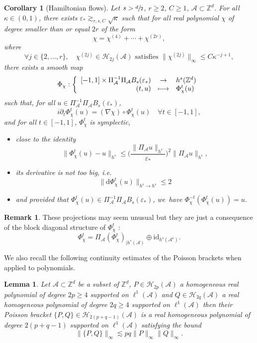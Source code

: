 \documentclass[10pt]{amsart}
\newcommand{\ie}{i.e.}
\let\dpl\displaystyle
\newcommand\mto{\mathchoice{\longmapsto}{\mapsto}{\mapsto}{\mapsto}}
\theoremstyle{plain}
\newtheorem{corollary}[theorem]{Corollary}
\newtheorem{lemma}[theorem]{Lemma}
\theoremstyle{definition}
\newtheorem{remark}[theorem]{Remark}
\newcommand{\1}{\mathbf{1}}
\begin{document}
\begin{corollary}[Hamiltonian flows]\label{cor:flow} Let $s > \sfrac{d}{2}$, $r\geq 2$, $C\geq 1$, $\mathcal{A} \subset \mathbb{Z}^d$. For all $\kappa \in (0,1)$, there exists $\varepsilon_* \gtrsim_{r,s,C} \sqrt{\kappa}$ such that for all real polynomial $\chi$ of degree smaller than or equal $2r$ of the form
\[
\chi = \chi^{(4)} + \cdots + \chi^{(2r)},
\]
where
\[
\forall j\in \{ 2,\dots,r\}, \quad \chi^{(2j)} \in \mathcal{H}_{2j}(\mathcal{A})\text{ satisfies } \| \chi^{(2j)} \|_{\infty} \leq C\kappa^{-j+1},
\]
there exists a smooth map
\[
\Phi_{\chi} : \left\{
\begin{array}{rcl} [-1,1] \times \Pi_{\mathcal{A}}^{-1}\Pi_{\mathcal{A}}B_s(\varepsilon_*) & \dpl\to & h^s(\mathbb{Z}^d) \\
(t,u) & \dpl\mto & \Phi_\chi^t(u)
\end{array}\right.
\]
such that, for all $u\in \Pi_{\mathcal{A}}^{-1}\Pi_{\mathcal{A}}B_s(\varepsilon_*) $,
\[
i\partial_t \Phi_\chi^t(u) = (\nabla \chi)\circ \Phi_\chi^t (u) \quad \forall t \in [-1,1],
\]
and for all $t\in [-1,1]$, $\Phi_\chi^t$ is symplectic,
\begin{itemize}
\item close to the identity
\[
\| \Phi_\chi^t(u) - u \|_{h^s} \leq \Big(\frac{\| \Pi_{\mathcal{A}}u \|_{h^s}}{ \varepsilon_* } \Big)^2 \| \Pi_{\mathcal{A}} u\|_{h^s},
\]
\item its derivative is not too big, \ie
\begin{equation}
\label{eq:d-varphi}
\| \mathrm{d} \Phi_\chi^t(u) \|_{h^s \to h^s} \leq 2
\end{equation}
\item and provided that $\Phi_\chi^t(u) \in \Pi_{\mathcal{A}}^{-1}\Pi_{\mathcal{A}}B_s(\varepsilon_*)$, we~have $\Phi_\chi^{-t}(\Phi_\chi^t(u)) = u $.
\end{itemize}
\end{corollary}

\begin{remark}
These projections may seem unusual but they are just a consequence of the block diagonal structure of $\Phi_\chi^t$ :
\[
\Phi_\chi^t = \Pi_{\mathcal{A}} (\Phi_\chi^t)_{| h^s(\mathcal{A})} \oplus \mathrm{id}_{h^s(\mathcal{A}^c)}.
\]
\end{remark}

We also recall the following continuity estimates of the Poisson brackets when applied to polynomials.
\begin{lemma} Let $\mathcal{A} \subset \mathbb{Z}^d$ be a subset of $\mathbb{Z}^d$, $P \in \mathcal{H}_{2p}(\mathcal{A})$ a homogeneous real polynomial of degree $2p\geq 4$ supported on $\ell^1(\mathcal{A})$ and $Q \in \mathcal{H}_{2q}(\mathcal{A})$ a real homogeneous polynomial of degree $2q\geq 4$ supported on $\ell^1(\mathcal{A})$ then their Poisson bracket $\{P,Q\} \in \mathcal{H}_{2(p+q-1)}(\mathcal{A})$ is a real homogeneous polynomial of degree $2(p+q-1)$ supported on $\ell^1(\mathcal{A})$ satisfying the bound
\[
\| \{ P,Q\} \|_{\infty} \lesssim pq \|P\|_{\infty} \| Q\|_{\infty}.
\]
\end{lemma}
\end{document}
